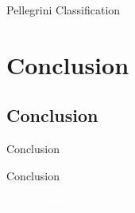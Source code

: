 \documentclass[  compress,xcolor={usenames,dvipsnames}]{beamer}
\begin{document}
\begin{frame}{Pellegrini Classification}
\begin{figure}
  \centering
  \resizebox{0.65\textwidth}{!}{}
\end{figure}
\end{frame}


\section{Conclusion}

\subsection{Conclusion}
\begin{frame}{Conclusion}
\begin{figure}
  \centering
  \resizebox{0.65\textwidth}{!}{}
\end{figure}
\end{frame}

\begin{frame}{Conclusion}
\begin{figure}
  \centering
  \resizebox{0.65\textwidth}{!}{}
\end{figure}
\end{frame}


\appendix

\begingroup
  \begin{frame}[plain]
    \centering
    \vfill{}\textcolor{white}{\MakeUppercase{Appendix}}
    \vfill
  \end{frame}
\endgroup
  
\end{document}
